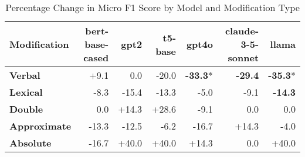 \begin{table}[h]
\centering
\begin{tabular}{lrrrrrr}
\hline
Modification & \textbf{bert-base-cased} & \textbf{gpt2} & \textbf{t5-base} & \textbf{gpt4o} & \textbf{claude-3-5-sonnet} & \textbf{llama} \\
\hline
\textbf{Verbal} & \cellcolor{green!27} +9.1 & \cellcolor{red!0} 0.0 & \cellcolor{red!30} -20.0 & \cellcolor{red!30} \textbf{-33.3}* & \cellcolor{red!30} \textbf{-29.4} & \cellcolor{red!30} \textbf{-35.3}* \\
\textbf{Lexical} & \cellcolor{red!24} -8.3 & \cellcolor{red!30} -15.4 & \cellcolor{red!30} -13.3 & \cellcolor{red!15} -5.0 & \cellcolor{red!27} -9.1 & \cellcolor{red!30} \textbf{-14.3} \\
\textbf{Double} & \cellcolor{red!0} 0.0 & \cellcolor{green!30} +14.3 & \cellcolor{green!30} +28.6 & \cellcolor{red!27} -9.1 & \cellcolor{red!0} 0.0 & \cellcolor{red!0} 0.0 \\
\textbf{Approximate} & \cellcolor{red!30} -13.3 & \cellcolor{red!30} -12.5 & \cellcolor{red!18} -6.2 & \cellcolor{red!30} -16.7 & \cellcolor{green!30} +14.3 & \cellcolor{red!12} -4.0 \\
\textbf{Absolute} & \cellcolor{red!30} -16.7 & \cellcolor{green!30} +40.0 & \cellcolor{green!30} +40.0 & \cellcolor{green!30} +14.3 & \cellcolor{red!0} 0.0 & \cellcolor{green!30} +40.0 \\
\hline
\end{tabular}
\caption{Percentage Change in Micro F1 Score by Model and Modification Type}
\label{tab:ner_results}
\end{table}